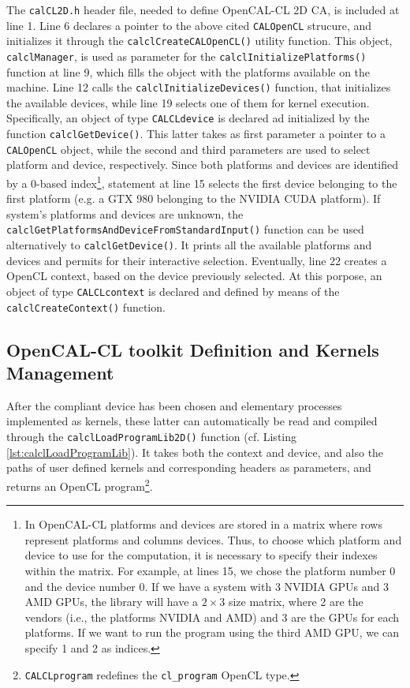 The \verb'calCL2D.h' header file, needed to define OpenCAL-CL 2D CA,
is included at line 1. Line 6 declares a pointer to the above cited
\verb'CALOpenCL' strucure, and initializes it through the
\verb'calclCreateCALOpenCL()' utility function. This object,
\verb'calclManager', is used as parameter for the
\verb'calclInitializePlatforms()' function at line 9, which fills the
object with the platforms available on the machine. Line 12 calls the
\verb'calclInitializeDevices()' function, that initializes the
available devices, while line 19 selects one of them for kernel
execution. Specifically, an object of type \verb'CALCLdevice' is
declared ad initialized by the function \verb'calclGetDevice()'. This
latter takes as first parameter a pointer to a \verb'CALOpenCL'
object, while the second and third parameters are used to select
platform and device, respectively. Since both platforms and devices
are identified by a 0-based index\footnote{In OpenCAL-CL platforms and
  devices are stored in a matrix where rows represent platforms and
  columns devices. Thus, to choose which platform and device to use
  for the computation, it is necessary to specify their indexes within
  the matrix. For example, at lines 15, we chose the platform number 0
  and the device number 0. If we have a system with 3 NVIDIA GPUs and
  3 AMD GPUs, the library will have a $2 \times 3$ size matrix, where
  2 are the vendors (i.e., the platforms NVIDIA and AMD) and 3 are the
  GPUs for each platforms. If we want to run the program using the
  third AMD GPU, we can specify 1 and 2 as indices.}, statement at
line 15 selects the first device belonging to the first platform
(e.g. a GTX 980 belonging to the NVIDIA CUDA platform). If system's
platforms and devices are unknown, the
\verb'calclGetPlatformsAndDeviceFromStandardInput()' function can be
used alternatively to \verb'calclGetDevice()'. It prints all the
available platforms and devices and permits for their interactive
selection. Eventually, line 22 creates a OpenCL context, based on the
device previously selected. At this porpose, an object of type
\verb'CALCLcontext' is declared and defined by means of the
\verb'calclCreateContext()' function.

\subsection{OpenCAL-CL toolkit Definition and Kernels Management}

After the compliant device has been chosen and elementary processes
implemented as kernels, these latter can automatically be read and
compiled through the \verb'calclLoadProgramLib2D()' function
(cf. Listing \ref{lst:calclLoadProgramLib}). It takes both the context
and device, and also the paths of user defined kernels and
corresponding headers as parameters, and returns an OpenCL
program\footnote{\texttt{CALCLprogram} redefines the
\texttt{cl\_program} OpenCL type.}.

